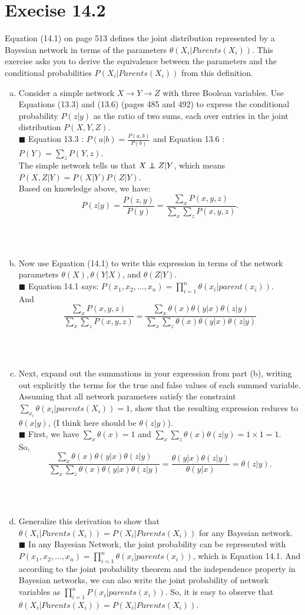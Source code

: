 \documentclass{article}
\newcommand{\solution}[1]{~\\ $\blacksquare$ \sffamily\upshape\selectfont #1
\normalfont ~\\~ }
\newcommand\independent{\protect\mathpalette{\protect\independenT}{\perp}}
\def\independenT#1#2{\mathrel{\rlap{$#1#2$}\mkern2mu{#1#2}}}
\begin{document}
\section{Execise 14.2}
Equation (14.1) on page 513 defines the joint distribution represented
by a Bayesian network in terms of the parameters $\theta
(X_i|Parents(X_i))$. This exercise asks you to derive the 
equivalence between the parameters and the conditional probabilities
$P(X_i|Parents(X_i))$ from this definition.
\begin{enumerate}[a.]
\item Consider a simple network $X \rightarrow Y \rightarrow Z$ with three
  Boolean variables. Use Equations (13.3) and (13.6) (pages 485 and
  492) to express the conditional probability $P(z|y)$ as the ratio of
  two sums, each over entries in the joint distribution $P(X,Y,Z)$. 
  \solution{
    Equation 13.3 : $P(a|b)=\frac{P(a,b)}{P(b)}$ and 
    Equation 13.6 : $P(Y)=\sum_zP(Y,z)$. \\
    The simple network tells us that $X\independent{Z}|Y$, which means
    $P(X,Z|Y) = P(X|Y)P(Z|Y)$. \\ 
    Based on knowledge above, we have:
    \[ P(z|y) = \frac{P(z,y)}{P(y)} =
    \frac{\sum_xP(x,y,z)}{\sum_x\sum_zP(x,y,z)}.\]
  }
\item Now use Equation (14.1) to write this expression in terms of the
  network parameters $\theta (X), \theta (Y|X)$, and $\theta(Z|Y)$.
  \solution{Equation 14.1 says:
    $P(x_1,x_2,\ldots,x_n)=\prod_{i=1}^n\theta (x_i|parent(x_i))$. \\
    And \[ \frac{\sum_xP(x,y,z)}{\sum_x\sum_zP(x,y,z)} =
    \frac{\sum_x\theta(x)\theta(y|x)\theta(z|y)} 
    {\sum_x\sum_z\theta(x)\theta(y|x)\theta(z|y)} \]
  }
\item Next, expand out the summations in your expression from part
  (b), writing out explicitly the terms for the true and false values
  of each summed variable. Assuming that all network parameters
  satisfy the constraint $\sum_{x_i}\theta (x_i|parents(X_i))=1$, show
  that the resulting expression reduces to \sout{$\theta(x|y)$}, (I
  think here should be $\theta(z|y)$). 
  \solution{
    First, we have $\sum_x\theta(x) = 1$ and
    $\sum_x\sum_z\theta(x)\theta(z|y) = 1\times 1 = 1$. \\
    So, 
    \[ \frac{\sum_x\theta(x)\theta(y|x)\theta(z|y)} 
    {\sum_x\sum_z\theta(x)\theta(y|x)\theta(z|y)} = 
    \frac{\theta(y|x)\theta(z|y)}{\theta(y|x)} = \theta(z|y).\]
}
\item Generalize this derivation to show that $\theta
  (X_i|Parents(X_i))=P(X_i|Parents(X_i))$ for any Bayesian network.
  \solution{In any Bayesian Network, the joint probability can be
    represented with $P(x_1,x_2,\ldots,x_n)=
    \prod_{i=1}^n\theta(x_i|parents(x_i))$, which is Equation 14.1. 
    And according to the joint probability theorem and the
    independence property in Bayesian networks, we can also write the
    joint probability of network variables as
    $\prod_{i=1}^nP(x_i|parents(x_i))$.
    So, it is easy to observe that $\theta
    (X_i|Parents(X_i))=P(X_i|Parents(X_i))$. 
}
\end{enumerate}
\end{document}
